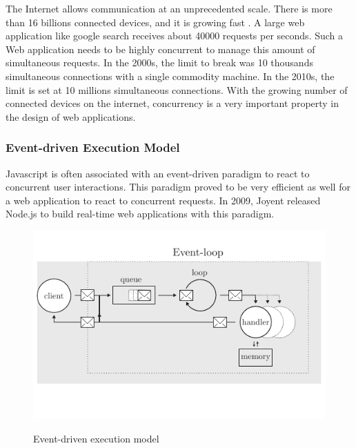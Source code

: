 The Internet allows communication at an unprecedented scale.
There is more than 16 billions connected devices, and it is growing fast \cite{Hilbert2011}.
A large web application like google search receives about \num{40000} requests per seconds.
Such a Web application needs to be highly concurrent to manage this amount of simultaneous requests.
In the 2000s, the limit to break was 10 thousands simultaneous connections with a single commodity machine.
In the 2010s, the limit is set at 10 millions simultaneous connections.
With the growing number of connected devices on the internet, concurrency is a very important property in the design of web applications.

\subsubsection{Event-driven Execution Model} \label{chapter2:web-as-a-platform:javascript:event-loop}

Javascript is often associated with an event-driven paradigm to react to concurrent user interactions.
This paradigm proved to be very efficient as well for a web application to react to concurrent requests.
In 2009, Joyent released Node.js to build real-time web applications with this paradigm.

\begin{figure}[h!]
  \centering
  \includegraphics[width=0.7\linewidth]{../resources/event-loop.pdf}
  \label{fig:event-loop}
  \caption{Event-driven execution model}
\end{figure}

